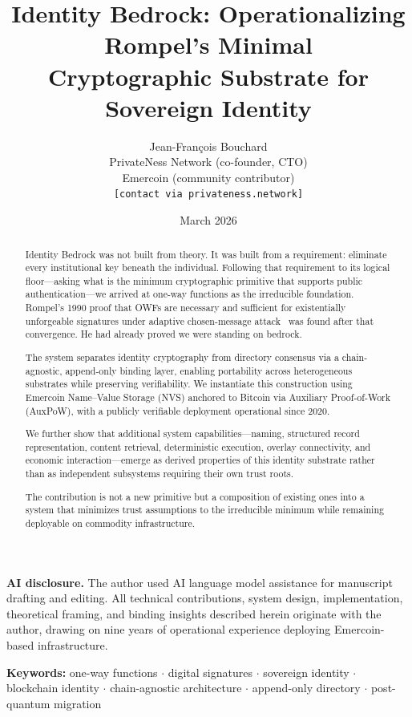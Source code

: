 \documentclass[11pt,a4paper]{article}
\title{\textbf{Identity Bedrock: Operationalizing Rompel's Minimal\\
Cryptographic Substrate for Sovereign Identity}}
\author{Jean-Fran\c{c}ois Bouchard\\
  \small PrivateNess Network (co-founder, CTO)\\
  \small Emercoin (community contributor)\\
  \small \texttt{[contact via privateness.network]}}
\date{March 2026}
\begin{document}
\maketitle

\noindent\textbf{AI disclosure.} The author used AI language model assistance
for manuscript drafting and editing.  All technical contributions, system
design, implementation, theoretical framing, and binding insights described
herein originate with the author, drawing on nine years of operational
experience deploying Emercoin-based infrastructure.

\begin{abstract}
Identity Bedrock was not built from theory.  It was built from a requirement:
eliminate every institutional key beneath the individual.  Following that
requirement to its logical floor---asking what is the minimum cryptographic
primitive that supports public authentication---we arrived at one-way functions
as the irreducible foundation.  Rompel's 1990 proof that OWFs are necessary
and sufficient for existentially unforgeable signatures under adaptive
chosen-message attack~\cite{rompel1990} was found after that convergence.
He had already proved we were standing on bedrock.

The system separates identity cryptography from directory consensus via a
chain-agnostic, append-only binding layer, enabling portability across
heterogeneous substrates while preserving verifiability.  We instantiate this
construction using Emercoin Name--Value Storage (NVS) anchored to Bitcoin
via Auxiliary Proof-of-Work (AuxPoW), with a publicly verifiable deployment
operational since 2020.

We further show that additional system capabilities---naming, structured
record representation, content retrieval, deterministic execution, overlay
connectivity, and economic interaction---emerge as derived properties of this
identity substrate rather than as independent subsystems requiring their own
trust roots.

The contribution is not a new primitive but a composition of existing ones
into a system that minimizes trust assumptions to the irreducible minimum
while remaining deployable on commodity infrastructure.
\end{abstract}

\noindent\textbf{Keywords:} one-way functions $\cdot$ digital signatures
$\cdot$ sovereign identity $\cdot$ blockchain identity $\cdot$
chain-agnostic architecture $\cdot$ append-only directory $\cdot$
post-quantum migration
\end{document}
